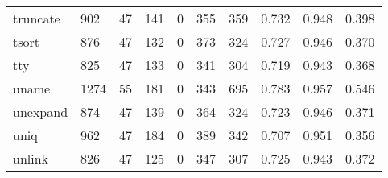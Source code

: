 \begin{longtable}{lp{2.0cm}p{2.0cm}p{2.0cm}p{2.0cm}p{2.0cm}p{2.0cm}p{2.0cm}p{2.0cm}p{2.0cm}}
truncate  &                    902 &                                 47 &                               141 &                                0 &                               355 &                             359 &                                   0.732 &                                  0.948 &                                0.398 \\
tsort     &                    876 &                                 47 &                               132 &                                0 &                               373 &                             324 &                                   0.727 &                                  0.946 &                                0.370 \\
tty       &                    825 &                                 47 &                               133 &                                0 &                               341 &                             304 &                                   0.719 &                                  0.943 &                                0.368 \\
uname     &                   1274 &                                 55 &                               181 &                                0 &                               343 &                             695 &                                   0.783 &                                  0.957 &                                0.546 \\
unexpand  &                    874 &                                 47 &                               139 &                                0 &                               364 &                             324 &                                   0.723 &                                  0.946 &                                0.371 \\
uniq      &                    962 &                                 47 &                               184 &                                0 &                               389 &                             342 &                                   0.707 &                                  0.951 &                                0.356 \\
unlink    &                    826 &                                 47 &                               125 &                                0 &                               347 &                             307 &                                   0.725 &                                  0.943 &                                0.372 \\

\end{longtable}

